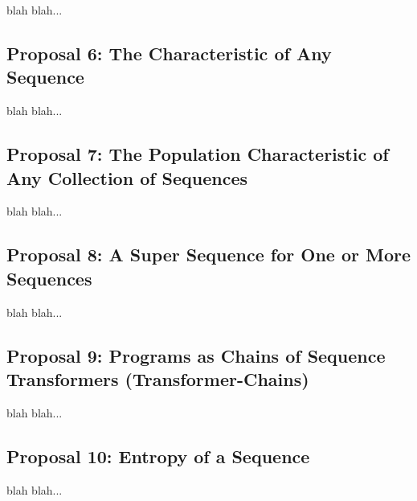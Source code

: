 \documentclass[11pt,a4paper]{article}
\begin{document}
blah blah...


\subsection{Proposal 6: The Characteristic of Any Sequence\cite{lutalo_2025_trans_genetics}}

blah blah...

\subsection{Proposal 7: The Population Characteristic of Any Collection of Sequences\cite{lutalo_2025_trans_genetics}}

blah blah...

\subsection{Proposal 8: A Super Sequence for One or More Sequences\cite{lutalo_2025_trans_genetics}}

blah blah...

\subsection{Proposal 9: Programs as Chains of Sequence Transformers (Transformer-Chains)\cite{lutalo_2025_trans_genetics}\cite{cli_tttt}}

blah blah...

\subsection{Proposal 10: Entropy of a Sequence\cite{lnspaper}}

blah blah...




\end{document}

